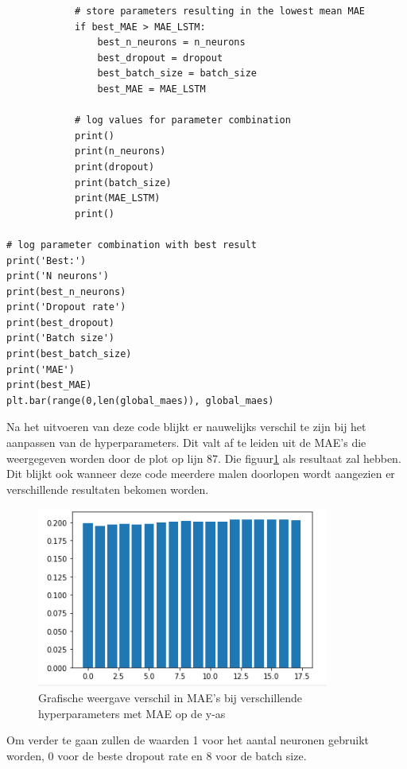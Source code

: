 \begin{verbatim}
            # store parameters resulting in the lowest mean MAE
            if best_MAE > MAE_LSTM:
                best_n_neurons = n_neurons
                best_dropout = dropout
                best_batch_size = batch_size
                best_MAE = MAE_LSTM
            
            # log values for parameter combination
            print()
            print(n_neurons)
            print(dropout)
            print(batch_size)
            print(MAE_LSTM)
            print()    

# log parameter combination with best result
print('Best:')
print('N neurons')
print(best_n_neurons)
print('Dropout rate')
print(best_dropout)
print('Batch size')
print(best_batch_size)
print('MAE')
print(best_MAE)
plt.bar(range(0,len(global_maes)), global_maes)
\end{verbatim}

Na het uitvoeren van deze code blijkt er nauwelijks verschil te zijn bij het aanpassen van de hyperparameters. Dit valt af te leiden uit de MAE's die weergegeven worden door de plot op lijn 87. Die figuur\ref{fig:uvnslstmbar} als resultaat zal hebben.
Dit blijkt ook wanneer deze code meerdere malen doorlopen wordt aangezien er verschillende resultaten bekomen worden.

\begin{figure}
    \centering
    \caption{Grafische weergave verschil in MAE's bij verschillende hyperparameters met MAE op de y-as}
    \label{fig:uvnslstmbar}
    \includegraphics[width=0.7\linewidth]{uv_ns_LSTM_bar}
\end{figure}

Om verder te gaan zullen de waarden 1 voor het aantal neuronen gebruikt worden, 0 voor de beste dropout rate en 8 voor de batch size. 

